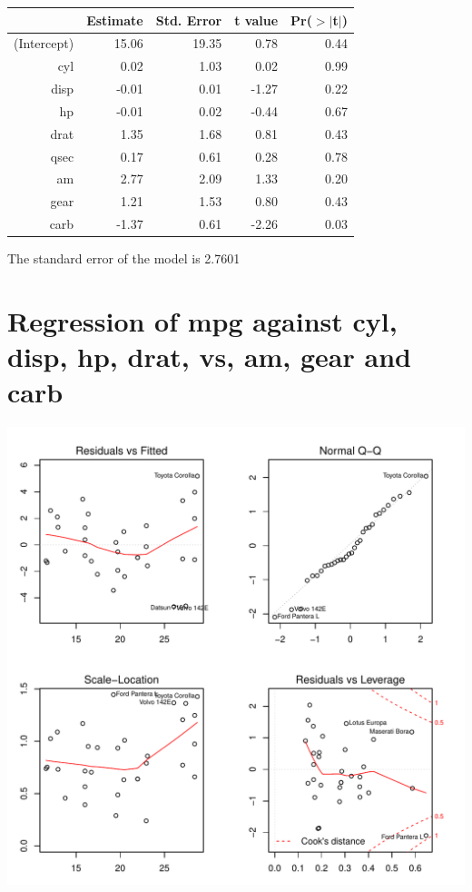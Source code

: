 \documentclass{article}\usepackage[]{graphicx}\usepackage[]{color}
\makeatletter
\def\maxwidth{ %
  \ifdim\Gin@nat@width>\linewidth
    \linewidth
  \else
    \Gin@nat@width
  \fi
}
\newenvironment{knitrout}{}{} %
\makeatother
\begin{document}
\begin{table}[ht]
\centering
\begin{tabular}{rrrrr}
  \hline
 & Estimate & Std. Error & t value & Pr($>$$|$t$|$) \\ 
  \hline
(Intercept) & 15.06 & 19.35 & 0.78 & 0.44 \\ 
  cyl & 0.02 & 1.03 & 0.02 & 0.99 \\ 
  disp & -0.01 & 0.01 & -1.27 & 0.22 \\ 
  hp & -0.01 & 0.02 & -0.44 & 0.67 \\ 
  drat & 1.35 & 1.68 & 0.81 & 0.43 \\ 
  qsec & 0.17 & 0.61 & 0.28 & 0.78 \\ 
  am & 2.77 & 2.09 & 1.33 & 0.20 \\ 
  gear & 1.21 & 1.53 & 0.80 & 0.43 \\ 
  carb & -1.37 & 0.61 & -2.26 & 0.03 \\ 
   \hline
\end{tabular}
\end{table}




The standard error of the model is 2.7601

\newpage

\section{Regression of mpg against cyl, disp, hp, drat, vs, am, gear and carb }
\begin{knitrout}
\color{fgcolor}

{\centering \includegraphics[width=\maxwidth]{figure/lm-cyl-disp-hp-drat-vs-am-gear-carb} 

}



\end{knitrout}
\end{document}

